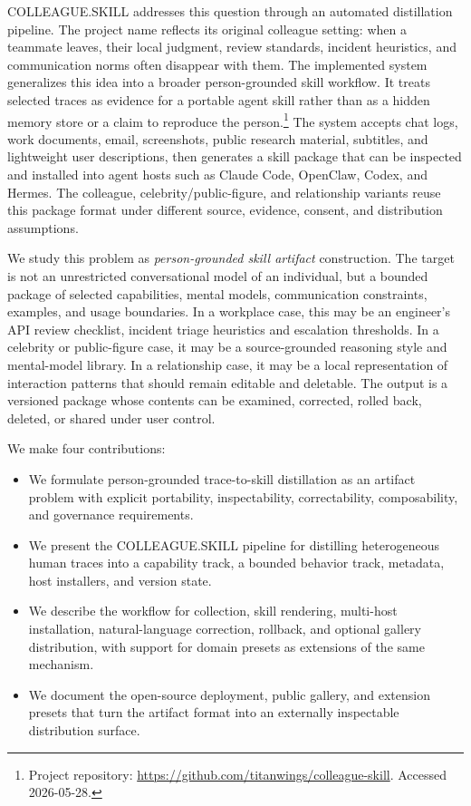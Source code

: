 \documentclass{article}
\newcommand{\system}{\textsc{COLLEAGUE.SKILL}\xspace}
\begin{document}
\system addresses this question through an automated distillation pipeline. The project name reflects its original colleague setting: when a teammate leaves, their local judgment, review standards, incident heuristics, and communication norms often disappear with them. The implemented system generalizes this idea into a broader person-grounded skill workflow. It treats selected traces as evidence for a portable agent skill rather than as a hidden memory store or a claim to reproduce the person.\footnote{Project repository: \url{https://github.com/titanwings/colleague-skill}. Accessed 2026-05-28.} The system accepts chat logs, work documents, email, screenshots, public research material, subtitles, and lightweight user descriptions, then generates a skill package that can be inspected and installed into agent hosts such as Claude Code, OpenClaw, Codex, and Hermes. The colleague, celebrity/public-figure, and relationship variants reuse this package format under different source, evidence, consent, and distribution assumptions.

We study this problem as \emph{person-grounded skill artifact} construction. The target is not an unrestricted conversational model of an individual, but a bounded package of selected capabilities, mental models, communication constraints, examples, and usage boundaries. In a workplace case, this may be an engineer's API review checklist, incident triage heuristics and escalation thresholds. In a celebrity or public-figure case, it may be a source-grounded reasoning style and mental-model library. In a relationship case, it may be a local representation of interaction patterns that should remain editable and deletable. The output is a versioned package whose contents can be examined, corrected, rolled back, deleted, or shared under user control.

We make four contributions:
\begin{itemize}
  \item We formulate person-grounded trace-to-skill distillation as an artifact problem with explicit portability, inspectability, correctability, composability, and governance requirements.
  \item We present the \system pipeline for distilling heterogeneous human traces into a capability track, a bounded behavior track, metadata, host installers, and version state.
  \item We describe the workflow for collection, skill rendering, multi-host installation, natural-language correction, rollback, and optional gallery distribution, with support for domain presets as extensions of the same mechanism.
  \item We document the open-source deployment, public gallery, and extension presets that turn the artifact format into an externally inspectable distribution surface.
\end{itemize}
\end{document}

